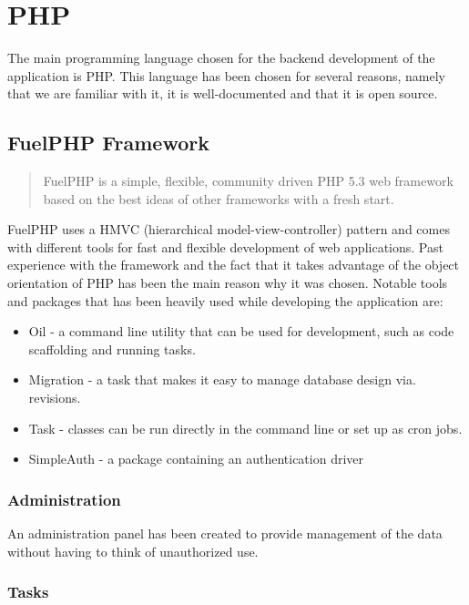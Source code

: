 \section{PHP}

The main programming language chosen for the backend development of the application is PHP. This language has been chosen for several reasons, namely that we are familiar with it, it is well-documented and that it is open source.

\subsection{FuelPHP Framework}

\begin{quote}
FuelPHP is a simple, flexible, community driven PHP 5.3 web framework based on the best ideas of other frameworks with a fresh start\cite{FuelPHP}.
\end{quote}


FuelPHP uses a HMVC (hierarchical model-view-controller) pattern and comes with different tools for fast and flexible development of web applications. Past experience with the framework and the fact that it takes advantage of the object orientation of PHP has been the main reason why it was chosen. Notable tools and packages that has been heavily used while developing the application are:

\begin{itemize}
\item Oil - a command line utility that can be used for development, such as code scaffolding and running tasks. 
\item Migration - a task that makes it easy to manage database design via. revisions.
\item Task - classes can be run directly in the command line or set up as cron jobs.
\item SimpleAuth - a package containing an authentication driver
\end{itemize}

\subsubsection{Administration}

An administration panel has been created to provide management of the data without having to think of unauthorized use. 

\subsubsection{Tasks}

